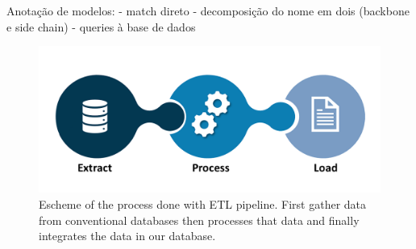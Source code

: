 \documentclass{llncs}
\begin{document}
Anotação de modelos:
    - match direto
    - decomposição do nome em dois (backbone e side chain) - queries à base de dados
\begin{figure}
    \includegraphics[width=\textwidth]{imagens/ETL.png}
    \caption{Escheme of the process done with ETL pipeline.
    First gather data from conventional databases
    then processes that data
    and finally integrates the data in our database.} \label{fig2}    
\end{figure}







\end{document}
